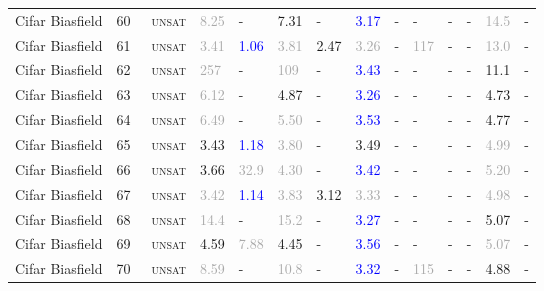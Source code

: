 \begin{center}
{\begin{longtable}{@{}llllllllllllll@{}}
Cifar Biasfield & 60 & ~\textsc{unsat} & \textcolor{darkgray}{8.25} & - & \textcolor{second}{7.31} & - & \textcolor{blue}{3.17} & - & - & - & - & \textcolor{darkgray}{14.5} & - \\
Cifar Biasfield & 61 & ~\textsc{unsat} & \textcolor{darkgray}{3.41} & \textcolor{blue}{1.06} & \textcolor{darkgray}{3.81} & \textcolor{second}{2.47} & \textcolor{darkgray}{3.26} & - & \textcolor{darkgray}{117} & - & - & \textcolor{darkgray}{13.0} & - \\
Cifar Biasfield & 62 & ~\textsc{unsat} & \textcolor{darkgray}{257} & - & \textcolor{darkgray}{109} & - & \textcolor{blue}{3.43} & - & - & - & - & \textcolor{second}{11.1} & - \\
Cifar Biasfield & 63 & ~\textsc{unsat} & \textcolor{darkgray}{6.12} & - & \textcolor{second}{4.87} & - & \textcolor{blue}{3.26} & - & - & - & - & \textcolor{second}{4.73} & - \\
Cifar Biasfield & 64 & ~\textsc{unsat} & \textcolor{darkgray}{6.49} & - & \textcolor{darkgray}{5.50} & - & \textcolor{blue}{3.53} & - & - & - & - & \textcolor{second}{4.77} & - \\
Cifar Biasfield & 65 & ~\textsc{unsat} & \textcolor{second}{3.43} & \textcolor{blue}{1.18} & \textcolor{darkgray}{3.80} & - & \textcolor{second}{3.49} & - & - & - & - & \textcolor{darkgray}{4.99} & - \\
Cifar Biasfield & 66 & ~\textsc{unsat} & \textcolor{second}{3.66} & \textcolor{darkgray}{32.9} & \textcolor{darkgray}{4.30} & - & \textcolor{blue}{3.42} & - & - & - & - & \textcolor{darkgray}{5.20} & - \\
Cifar Biasfield & 67 & ~\textsc{unsat} & \textcolor{darkgray}{3.42} & \textcolor{blue}{1.14} & \textcolor{darkgray}{3.83} & \textcolor{second}{3.12} & \textcolor{darkgray}{3.33} & - & - & - & - & \textcolor{darkgray}{4.98} & - \\
Cifar Biasfield & 68 & ~\textsc{unsat} & \textcolor{darkgray}{14.4} & - & \textcolor{darkgray}{15.2} & - & \textcolor{blue}{3.27} & - & - & - & - & \textcolor{second}{5.07} & - \\
Cifar Biasfield & 69 & ~\textsc{unsat} & \textcolor{second}{4.59} & \textcolor{darkgray}{7.88} & \textcolor{second}{4.45} & - & \textcolor{blue}{3.56} & - & - & - & - & \textcolor{darkgray}{5.07} & - \\
Cifar Biasfield & 70 & ~\textsc{unsat} & \textcolor{darkgray}{8.59} & - & \textcolor{darkgray}{10.8} & - & \textcolor{blue}{3.32} & - & \textcolor{darkgray}{115} & - & - & \textcolor{second}{4.88} & - \\

\end{longtable}}
\end{center}
